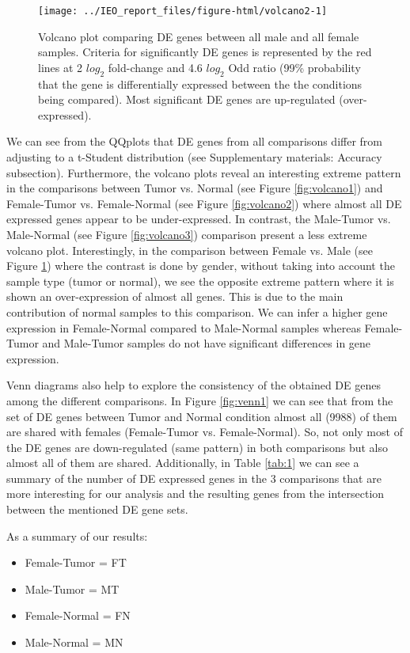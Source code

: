 \documentclass[9pt,twocolumn,twoside]{gsajnl}
\begin{document}
\begin{figure}
\centering
\texttt{[image: ../IEO\_report\_files/figure-html/volcano2-1]}
\caption{Volcano plot comparing DE genes between all male and all female samples. Criteria for significantly DE genes is represented by the red lines at 2 $log_{2}$ fold-change and 4.6 $log_{2}$ Odd ratio (99\% probability that the gene is differentially expressed between the the conditions being compared). Most significant DE genes are up-regulated (over-expressed).}
\label{fig:volcano4}
\end{figure}


We can see from the QQplots that DE genes from all comparisons differ from adjusting to a t-Student distribution (see Supplementary materials: Accuracy subsection). Furthermore, the volcano plots reveal an interesting extreme pattern in the comparisons between Tumor vs. Normal (see Figure \ref{fig:volcano1}) and Female-Tumor vs. Female-Normal (see Figure \ref{fig:volcano2}) where almost all DE expressed genes appear to be under-expressed. In contrast, the Male-Tumor vs. Male-Normal (see Figure \ref{fig:volcano3}) comparison present a less extreme volcano plot. Interestingly, in the comparison between Female vs. Male (see Figure \ref{fig:volcano4}) where the contrast is done by gender, without taking into account the sample type (tumor or normal), we see the opposite extreme pattern where it is shown an over-expression of almost all genes. This is due to the main contribution of normal samples to this comparison. We can infer a higher gene expression in Female-Normal compared to Male-Normal samples whereas Female-Tumor and Male-Tumor samples do not have significant differences in gene expression. 

Venn diagrams also help to explore the consistency of the obtained DE genes among the different comparisons. In Figure \ref{fig:venn1} we can see that from the set of DE genes between Tumor and Normal condition almost all (9988) of them are shared with females (Female-Tumor vs. Female-Normal). So, not only most of the DE genes are down-regulated (same pattern) in both comparisons but also almost all of them are shared. Additionally, in Table \ref{tab:1} we can see a summary of the number of DE expressed genes in the 3 comparisons that are more interesting for our analysis and the resulting genes from the intersection between the mentioned DE gene sets.


As a summary of our results:
\begin{itemize}
\item Female-Tumor = FT
\item Male-Tumor = MT
\item Female-Normal = FN
\item Male-Normal = MN
\end{itemize}
\end{document}
